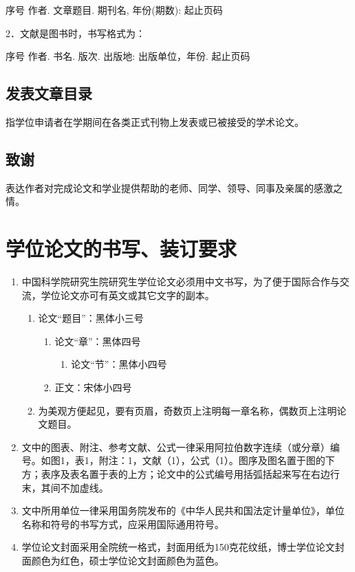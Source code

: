 \documentclass[a4paper,12pt,oneside,openany]{book}
\begin{document}
\begin{CJK}{UTF8}{hei}
序号 作者. 文章题目. 期刊名, 年份(期数): 起止页码

2．文献是图书时，书写格式为：

序号 作者. 书名. 版次. 出版地: 出版单位，年份. 起止页码


\subsection{发表文章目录}

指学位申请者在学期间在各类正式刊物上发表或已被接受的学术论文。


\subsection{致谢}

表达作者对完成论文和学业提供帮助的老师、同学、领导、同事及亲属的感激之情。


\section{学位论文的书写、装订要求}
\begin{enumerate}
\item 中国科学院研究生院研究生学位论文必须用中文书写，为了便于国际合作与交流，学位论文亦可有英文或其它文字的副本。

\begin{enumerate}
\item 论文“题目”：黑体小三号

\begin{enumerate}
\item 论文“章”：黑体四号

\begin{enumerate}
\item 论文“节”：黑体小四号
\end{enumerate}
\item 正文：宋体小四号
\end{enumerate}
\item 为美观方便起见，要有页眉，奇数页上注明每一章名称，偶数页上注明论文题目。
\end{enumerate}
\item 文中的图表、附注、参考文献、公式一律采用阿拉伯数字连续（或分章）编号。如图1，表1，附注：1，文献（1），公式（1）。图序及图名置于图的下方；表序及表名置于表的上方；论文中的公式编号用括弧括起来写在右边行末，其间不加虚线。
\item 文中所用单位一律采用国务院发布的《中华人民共和国法定计量单位》，单位名称和符号的书写方式，应采用国际通用符号。
\item 学位论文封面采用全院统一格式，封面用纸为150克花纹纸，博士学位论文封面颜色为红色，硕士学位论文封面颜色为蓝色。 
\end{enumerate}
\printindex{}



\end{CJK}
\end{document}
